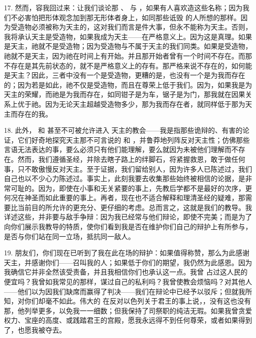 17. 然而，容我回过来：让我们谈论那 、 与 ，如果有人喜欢造这些名称；因为我们不必害怕把形体观念加到那无形体者身上，如同那些诋毁  的人所想的那样。因为受造物必须被称为天主的，这对我们而言是件大事，但永不能称为天主。否则，我将承认天主是受造物，如果我成为天主——在严格意义上。因为这是真理。如果是天主，祂就不是受造物；因为受造物与不属于天主的我们同类。如果是受造物，祂就不是天主，因为祂在时间上有开始。并且那开始者曾有一个时间不存在。而那不存在是其先前状态的，就不是严格意义上的存有。那严格来说不存在的，如何能是天主？因此，三者中没有一个是受造物，更糟的是，也没有一个是为我而存在的；因为若是如此，祂不仅是受造物，而且在尊荣上低于我们。因为，如果我是为天主的荣耀，而祂是为我而存在，如同钳子是为车，锯子是为门，那我就在因果关系上优于祂。因为无论天主超越受造物多少，那为我而存在者，就同样低于那为天主而存在的我。\par

18. 此外， 和  甚至不可被允许进入  天主的教会——我是指那些诡辩的、有害的论证，它们好奇地探究天主那不可言说的  和 ，并鲁莽地列阵反对天主性；仿佛那些言语无法表达的事，要么必须只有他们能理解，要么就因为未被他们理解而不存在。然而，我们遵循圣经，并除去瞎子路上的绊脚石，将紧握救恩，敢于做任何事，只不敢傲慢反对天主。至于证据，我们留给别人，因为许多人已陈述过，我们自己也以不少心力陈述过。事实上，此刻我要去收集那些始终被相信的论据，是非常可耻的。因为，即使在小事和无关紧要的事上，先教后学都不是最好的次序，更何况在神圣而如此重要的事上。再者，现在也不适合解释和理清圣经的疑难，那需要比当前目的所允许的更充分、更仔细的考虑。总而言之，这就是我们的教导。我详述这些，并非要与敌手争辩：因为我已经常与他们辩论，即使不完美；而是为了向你们展示我教导的特质，使你们看到我是否在维护你们自己的辩护上有所参与，是否与你们站在同一立场，抵抗同一敌人。\par

19. 朋友们，你们现在已听到了我在此在场的辩护：如果值得称赞，那么为此感谢天主，并感谢你们——召叫我的人；如果低于你们的期望，我仍然为此感恩。因为我确信它并非全然该受责备，并且我相信你们也承认这一点。我曾  占过这人民的便宜吗？我曾如我常见的那样，谋过自己的私利吗？我曾使教会烦恼吗？对其他人——他们以为因我们缺席而赢得了判决——我们在辩论中已经予以驳斥；但就我所知，对你们却毫不如此。伟大的  在反对以色列关于君王的事上说，，没有这也没有那，他列举更多，以免我一一细数；但我保持了司祭职的纯洁无瑕。如果我曾贪爱权力、宝座的高度、或践踏君王的宫殿，愿我永远得不到任何尊荣，或者如果得到了，也愿我被夺去。\par

